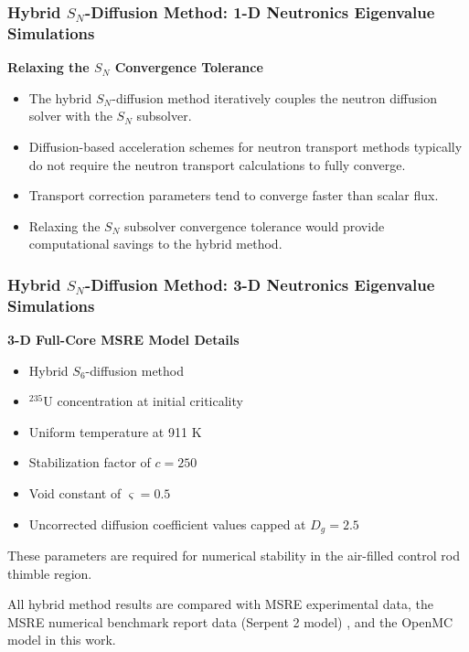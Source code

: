 \begin{frame}[noframenumbering]
  \frametitle{Hybrid $S_N$-Diffusion Method: 1-D Neutronics Eigenvalue Simulations}
  \textbf{Relaxing the $S_N$ Convergence Tolerance}
  \begin{itemize}
    \item The hybrid $S_N$-diffusion method iteratively couples the neutron diffusion solver with
      the $S_N$ subsolver.
    \item Diffusion-based acceleration schemes for neutron transport methods typically do not
      require the neutron transport calculations to fully converge.
    \item Transport correction parameters tend to converge faster than scalar flux.
    \item Relaxing the $S_N$ subsolver convergence tolerance would provide computational savings to
      the hybrid method.
  \end{itemize}
\end{frame}

\begin{frame}[noframenumbering]
  \frametitle{Hybrid $S_N$-Diffusion Method: 3-D Neutronics Eigenvalue Simulations}
  \textbf{3-D Full-Core MSRE Model Details}
  \begin{itemize}
    \item Hybrid $S_6$-diffusion method
    \item $^{235}$U concentration at initial criticality
    \item Uniform temperature at 911 K
    \item Stabilization factor of $c=250$
    \item Void constant of $\varsigma=0.5$
    \item Uncorrected diffusion coefficient values capped at $D_g = 2.5$
  \end{itemize}
  \vspace{.2cm}

  These parameters are required for numerical stability in the air-filled control rod
  thimble region.
  \vspace{.2cm}

  All hybrid method results are compared with MSRE experimental data, the MSRE numerical benchmark
  report data (Serpent 2 model) \cite{fratoni_molten_2020}, and the OpenMC model in this work.
\end{frame}

